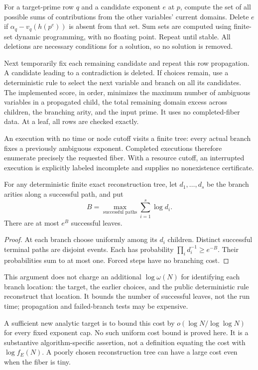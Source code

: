 For a target-prime row $q$ and a candidate exponent $e$ at $p$, compute the set of all possible sums of contributions from the other variables' current domains. Delete $e$ if $\alpha_q-v_q(h(p^e))$ is absent from that set. Sum sets are computed using finite-set dynamic programming, with no floating point. Repeat until stable. All deletions are necessary conditions for a solution, so no solution is removed.

Next temporarily fix each remaining candidate and repeat this row propagation. A candidate leading to a contradiction is deleted. If choices remain, use a deterministic rule to select the next variable and branch on all its candidates. The implemented score, in order, minimizes the maximum number of ambiguous variables in a propagated child, the total remaining domain excess across children, the branching arity, and the input prime. It uses no completed-fiber data. At a leaf, all rows are checked exactly.

An execution with no time or node cutoff visits a finite tree: every actual branch fixes a previously ambiguous exponent. Completed executions therefore enumerate precisely the requested fiber. With a resource cutoff, an interrupted execution is explicitly labeled incomplete and supplies no nonexistence certificate.

\begin{proposition}\label{adaptive:prop:cost}
For any deterministic finite exact reconstruction tree, let $d_1,\ldots,d_s$ be the branch arities along a successful path, and put
\[
 B=\max_{\text{successful paths}}\sum_{i=1}^s\log d_i.
\]
There are at most $e^B$ successful leaves.
\end{proposition}
\begin{proof}
At each branch choose uniformly among its $d_i$ children. Distinct successful terminal paths are disjoint events. Each has probability $\prod_i d_i^{-1}\ge e^{-B}$. Their probabilities sum to at most one. Forced steps have no branching cost.
\end{proof}

This argument does not charge an additional $\log\omega(N)$ for identifying each branch location: the target, the earlier choices, and the public deterministic rule reconstruct that location. It bounds the number of successful leaves, not the run time; propagation and failed-branch tests may be expensive.

A sufficient new analytic target is to bound this cost by $o(\log N/\log\log N)$ for every fixed exponent cap. No such uniform cost bound is proved here. It is a substantive algorithm-specific assertion, not a definition equating the cost with $\log f_E(N)$. A poorly chosen reconstruction tree can have a large cost even when the fiber is tiny.


